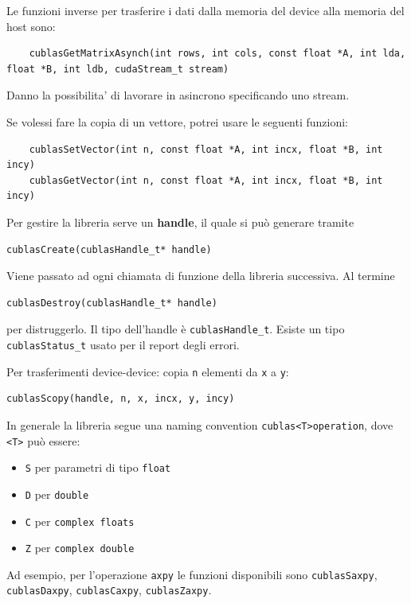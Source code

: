 Le funzioni inverse per trasferire i dati dalla memoria del device alla memoria del host sono:
\begin{lstlisting}
    cublasGetMatrixAsynch(int rows, int cols, const float *A, int lda, float *B, int ldb, cudaStream_t stream)
\end{lstlisting}

Danno la possibilita' di lavorare in asincrono specificando uno stream.

Se volessi fare la copia di un vettore, potrei usare le seguenti funzioni:
\begin{lstlisting}
    cublasSetVector(int n, const float *A, int incx, float *B, int incy)
    cublasGetVector(int n, const float *A, int incx, float *B, int incy)
\end{lstlisting}

Per gestire la libreria serve un \textbf{handle}, il quale si può generare tramite
\begin{lstlisting}
cublasCreate(cublasHandle_t* handle)
\end{lstlisting}

Viene passato ad ogni chiamata di funzione della libreria successiva. Al termine
\begin{lstlisting}
cublasDestroy(cublasHandle_t* handle)
\end{lstlisting}
per distruggerlo. Il tipo dell'handle è \texttt{cublasHandle\_t}. Esiste un tipo \texttt{cublasStatus\_t} usato per il report degli errori.

Per trasferimenti device-device: copia \texttt{n} elementi da \texttt{x} a \texttt{y}:
\begin{lstlisting}
cublasScopy(handle, n, x, incx, y, incy)
\end{lstlisting}

In generale la libreria segue una naming convention \texttt{cublas<T>operation}, dove \texttt{<T>} può essere: 
\begin{itemize}
	\item \texttt{S} per parametri di tipo \texttt{float}

	\item \texttt{D} per \texttt{double}

	\item \texttt{C} per \texttt{complex  floats}

	\item \texttt{Z} per \texttt{complex double}
\end{itemize}
Ad esempio, per l'operazione \texttt{axpy} le funzioni disponibili sono \texttt{cublasSaxpy}, \texttt{cublasDaxpy}, \texttt{cublasCaxpy}, \texttt{cublasZaxpy}.

